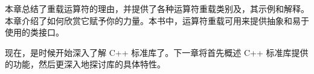 本章总结了重载运算符的理由，并提供了各种运算符重载类别及，其示例和解释。本章介绍了如何欣赏它赋予你的力量。本书中，运算符重载可用来提供抽象和易于使用的类接口。

现在，是时候开始深入了解 C++ 标准库了。下一章将首先概述 C++ 标准库提供的功能，然后更深入地探讨库的具体特性。
